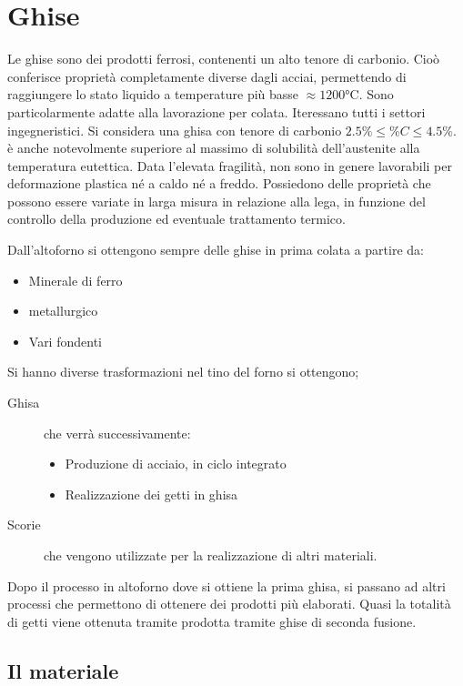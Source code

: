 \chapter{Ghise}\label{chp:Ghise}
Le ghise sono dei prodotti ferrosi, contenenti un alto tenore di carbonio.
Cioò conferisce proprietà completamente diverse dagli acciai, permettendo di raggiungere lo stato liquido a temperature più basse $\approx 1200\unit{\celsius}$. Sono particolarmente adatte alla lavorazione per colata.
Iteressano tutti i settori ingegneristici. 
Si considera una ghisa con tenore di carbonio $2.5\% \leq \%C \leq 4.5\%$.
è anche notevolmente superiore al massimo di solubilità dell'austenite alla temperatura eutettica.
Data l'elevata fragilità, non sono in genere lavorabili per deformazione plastica né a caldo né a freddo.
Possiedono delle proprietà che possono essere variate in larga misura in relazione alla lega, in funzione del controllo della produzione ed eventuale trattamento termico.

Dall'altoforno si ottengono sempre delle ghise in prima colata a partire da:
\begin{itemize}
\item Minerale di ferro
\item {} metallurgico
\item Vari fondenti
\end{itemize}
Si hanno diverse trasformazioni nel tino del forno si ottengono;
\begin{description}
\item[Ghisa] che verrà successivamente:
	\begin{itemize}
	\item Produzione di acciaio, in ciclo integrato
	\item Realizzazione dei getti in ghisa
	\end{itemize}
\item[Scorie] che vengono utilizzate per la realizzazione di altri materiali.
\end{description}
Dopo il processo in altoforno dove si ottiene la prima ghisa, si passano ad altri processi che permettono di ottenere dei prodotti più elaborati.
Quasi la totalità di getti viene ottenuta tramite prodotta tramite ghise di seconda fusione.


\section{Il materiale}

